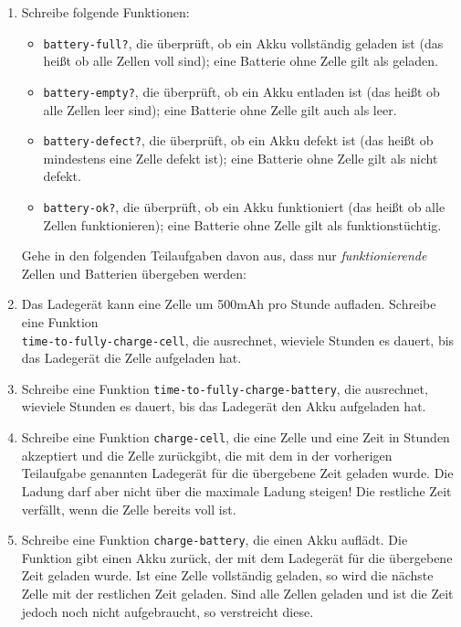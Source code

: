 \begin{aufgabe}
\begin{enumerate}
  \item Schreibe folgende Funktionen:

    \begin{itemize}
    \item \lstinline{battery-full?}, die überprüft, ob ein Akku
      vollständig geladen ist (das heißt ob alle Zellen voll sind); eine
      Batterie ohne Zelle gilt als geladen.

    \item \lstinline{battery-empty?}, die überprüft, ob ein Akku entladen
      ist (das heißt ob alle Zellen leer sind); eine Batterie ohne Zelle
      gilt auch als leer.

    \item \lstinline{battery-defect?}, die überprüft, ob ein Akku defekt
      ist (das heißt ob mindestens eine Zelle defekt ist); eine Batterie
      ohne Zelle gilt als nicht defekt.

    \item \lstinline{battery-ok?}, die überprüft, ob ein Akku
      funktioniert (das heißt ob alle Zellen funktionieren); eine Batterie
      ohne Zelle gilt als funktionstüchtig.
      
    \end{itemize}

    Gehe in den folgenden Teilaufgaben davon aus, dass
      nur \emph{funktionierende} Zellen und Batterien übergeben
      werden:

  \item Das Ladegerät kann eine Zelle um 500mAh pro Stunde
    aufladen.  Schreibe eine Funktion \\
    \lstinline{time-to-fully-charge-cell}, die ausrechnet, wieviele
    Stunden es dauert, bis das Ladegerät die Zelle aufgeladen hat.

  \item Schreibe eine Funktion
    \lstinline{time-to-fully-charge-battery}, die ausrechnet, wieviele
    Stunden es dauert, bis das Ladegerät den Akku aufgeladen hat.

  \item Schreibe eine Funktion \lstinline{charge-cell}, die eine
    Zelle und eine Zeit in Stunden akzeptiert und die Zelle
    zurückgibt, die mit dem in der vorherigen Teilaufgabe genannten
    Ladegerät für die übergebene Zeit geladen wurde.  Die Ladung darf
    aber nicht über die maximale Ladung steigen!  Die restliche Zeit
    verfällt, wenn die Zelle bereits voll ist.

  \item Schreibe eine Funktion \lstinline{charge-battery}, die einen
    Akku auflädt.  Die Funktion gibt einen Akku zurück, der mit dem
    Ladegerät für die übergebene Zeit geladen wurde.  Ist eine Zelle
    vollständig geladen, so wird die nächste Zelle mit der restlichen
    Zeit geladen.  Sind alle Zellen geladen und ist die Zeit jedoch
    noch nicht aufgebraucht, so verstreicht diese.


\end{enumerate}
\end{aufgabe}
